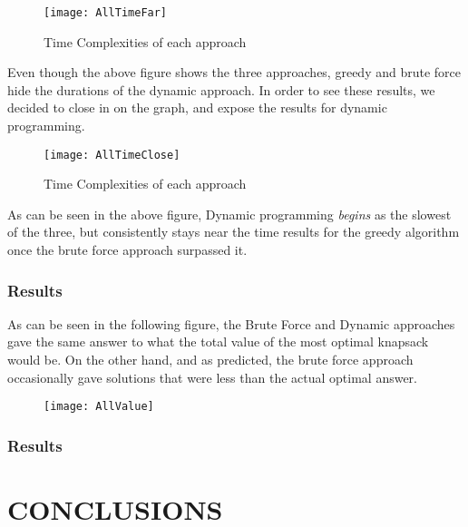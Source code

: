 \documentclass[12pt]{article}
\begin{document}
    \begin{figure}[H]
		\begin{center}    
    		\texttt{[image: AllTimeFar]}
            \caption{Time Complexities of each approach}
    	\end{center}
    \end{figure}
    
    Even though the above figure shows the three approaches, greedy and brute force hide the durations of the dynamic approach. In order to see these results, we decided to close in on the graph, and expose the results for dynamic programming.
    
   \begin{figure}[H]
		\begin{center}    
    		\texttt{[image: AllTimeClose]}
            \caption{Time Complexities of each approach}
    	\end{center}
    \end{figure}
    
    As can be seen in the above figure, Dynamic programming \textit{begins} as the slowest of the three, but consistently stays near the time results for the greedy algorithm once the brute force approach surpassed it. 
    
    
    
    \subsubsection*{Results}
    
    As can be seen in the following figure, the Brute Force and Dynamic approaches gave the same answer to what the total value of the most optimal knapsack would be. On the other hand, and as predicted, the brute force approach occasionally gave solutions that were less than the actual optimal answer. 
    
 	\begin{figure}[H]
		\begin{center}  
        	\texttt{[image: AllValue]}
    	\end{center}
    \end{figure}
    
    
    \subsubsection*{Results}
    
	
	\section*{CONCLUSIONS}
	
\end{document}
